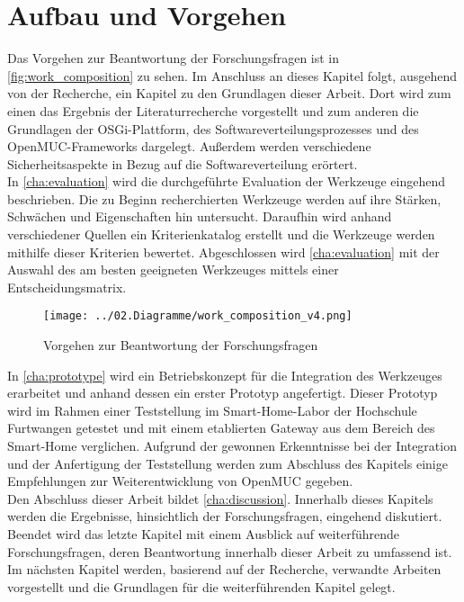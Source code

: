 \section{Aufbau und Vorgehen}
Das Vorgehen zur Beantwortung der Forschungsfragen ist in \autoref{fig:work_composition} zu sehen.
Im Anschluss an dieses Kapitel folgt, ausgehend von der Recherche, ein Kapitel zu den Grundlagen dieser Arbeit.
Dort wird zum einen das Ergebnis der Literaturrecherche vorgestellt und zum anderen die Grundlagen 
der \ac{OSGi}-Plattform, des Softwareverteilungsprozesses und des OpenMUC-Frameworks dargelegt.
Außerdem werden verschiedene Sicherheitsaspekte in Bezug auf die Softwareverteilung erörtert.\\

In \autoref{cha:evaluation} wird die durchgeführte Evaluation der Werkzeuge eingehend beschrieben.
Die zu Beginn recherchierten Werkzeuge werden auf ihre Stärken, Schwächen und Eigenschaften hin untersucht.
Daraufhin wird anhand verschiedener Quellen ein Kriterienkatalog erstellt und die Werkzeuge werden mithilfe dieser Kriterien bewertet.
Abgeschlossen wird \autoref{cha:evaluation} mit der Auswahl des am besten geeigneten Werkzeuges mittels einer Entscheidungsmatrix.

\begin{figure}[ht]
 \centering
 \texttt{[image: ../02.Diagramme/work\_composition\_v4.png]}%
 \caption{Vorgehen zur Beantwortung der Forschungsfragen}
 \label{fig:work_composition}
\end{figure}


In \autoref{cha:prototype} wird ein Betriebskonzept für die Integration des Werkzeuges erarbeitet und anhand dessen ein erster Prototyp angefertigt.
Dieser Prototyp wird im Rahmen einer Teststellung im Smart-Home-Labor der Hochschule Furtwangen getestet und mit einem etablierten 
Gateway aus dem Bereich des Smart-Home verglichen.
Aufgrund der gewonnen Erkenntnisse bei der Integration und der Anfertigung der Teststellung werden zum Abschluss des Kapitels 
einige Empfehlungen zur Weiterentwicklung von OpenMUC gegeben.\\

Den Abschluss dieser Arbeit bildet \autoref{cha:discussion}. Innerhalb dieses Kapitels werden die Ergebnisse, hinsichtlich der Forschungsfragen, eingehend diskutiert.
Beendet wird das letzte Kapitel mit einem Ausblick auf weiterführende Forschungsfragen, deren Beantwortung innerhalb dieser Arbeit zu umfassend ist.\\

Im nächsten Kapitel werden, basierend auf der Recherche, verwandte Arbeiten vorgestellt und die Grundlagen für 
die weiterführenden Kapitel gelegt.



